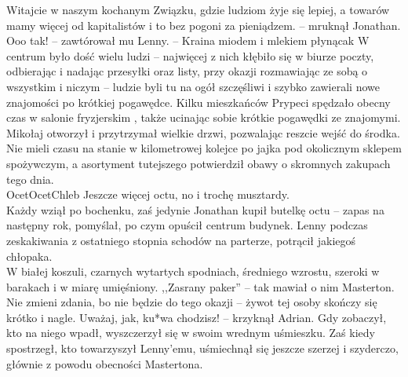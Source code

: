 \documentclass[../MAIN.tex]{subfiles}
\begin{document}
\sx Witajcie w naszym kochanym Związku, gdzie ludziom żyje się lepiej, a towarów mamy więcej od kapitalistów i to bez pogoni za pieniądzem. -- mruknął Jonathan.
\xx Ooo tak! -- zawtórował mu Lenny. -- Kraina miodem i mlekiem płynąca\3k \qd
W centrum było dość wielu ludzi -- najwięcej z nich kłębiło się w biurze poczty, odbierając i nadając przesyłki oraz listy, przy okazji rozmawiając ze sobą o wszystkim i niczym -- ludzie byli tu na ogół szczęśliwi i szybko zawierali nowe znajomości po krótkiej pogawędce. Kilku mieszkańców Prypeci spędzało obecny czas w salonie fryzjerskim , także ucinając sobie krótkie pogawędki ze znajomymi. Mikołaj otworzył i przytrzymał wielkie drzwi, pozwalając reszcie wejść do środka. Nie mieli czasu na stanie w kilometrowej kolejce po jajka pod okolicznym sklepem spożywczym, a asortyment tutejszego potwierdził obawy o skromnych zakupach tego dnia.\\
Ocet\dotfill Ocet\dotfill Chleb\dotfill
Jeszcze więcej octu, no i trochę musztardy.\\
Każdy wziął po bochenku, zaś jedynie Jonathan kupił butelkę octu -- zapas na następny rok, pomyślał, po czym opuścił centrum budynek. Lenny podczas zeskakiwania z ostatniego stopnia schodów na parterze, potrącił jakiegoś chłopaka. \\
W białej koszuli, czarnych wytartych spodniach, średniego wzrostu, szeroki w barakach i w miarę umięśniony. ,,Zasrany paker'' -- tak mawiał o nim Masterton. Nie zmieni zdania, bo nie będzie do tego okazji -- żywot tej osoby skończy się krótko i nagle.
\sx Uważaj, jak, ku*wa chodzisz! -- krzyknął Adrian.
\qd
Gdy zobaczył, kto na niego wpadł, wyszczerzył się w swoim wrednym uśmieszku. Zaś kiedy spostrzegł, kto towarzyszył Lenny’emu, uśmiechnął się jeszcze szerzej i szyderczo, głównie z powodu obecności Mastertona.
\end{document}
